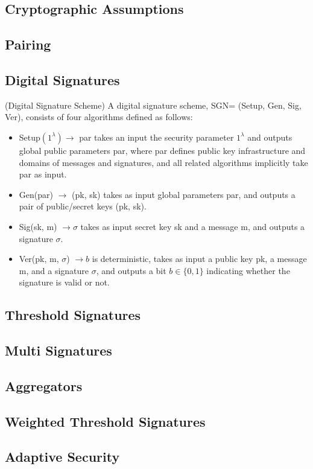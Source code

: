 \subsection{Cryptographic Assumptions}

\subsection{Pairing}

\subsection{Digital Signatures}

\begin{definition}{(Digital Signature Scheme)} A digital signature scheme, {\sffamily SGN= (Setup, Gen, Sig, Ver)}, consists of four algorithms defined as follows: 
\end{definition}
\begin{itemize}
    \item {\sffamily Setup$(1^\lambda) \to $ par} takes an input the security parameter $1^\lambda$ and outputs global public parameters {\sffamily par}, where {\sffamily par} defines public key infrastructure and domains of messages and signatures, and all related algorithms implicitly take {\sffamily par} as input.  
    \item {\sffamily Gen(par) $\to $ (pk, sk)} takes as input global parameters {\sffamily par}, and outputs a pair of public/secret keys {\sffamily (pk, sk)}. 
    \item {\sffamily Sig(sk, m) $\to\sigma$} takes as input secret key {\sffamily sk} and a message {\sffamily m}, and outputs a signature $\sigma$. 
    \item {\sffamily Ver(pk, m, $\sigma$) $\to b$} is deterministic, takes as input a public key {\sffamily pk}, a message {\sffamily m}, and a signature $\sigma$,  and outputs a bit $b\in\{0,1\}$ indicating whether the signature is valid or not. 
\end{itemize}

\subsubsection{}

\subsection{Threshold Signatures}

\subsection{Multi Signatures}

\subsection{Aggregators}

\subsection{Weighted Threshold Signatures}

\subsection{Adaptive Security}